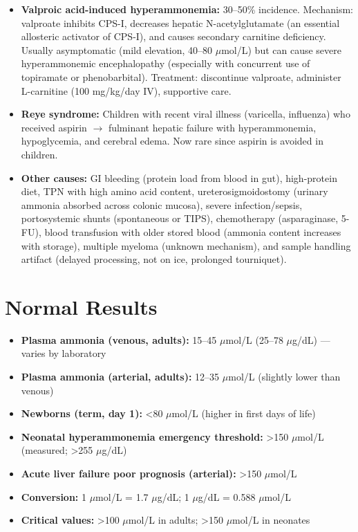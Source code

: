 \begin{itemize}
  \item \textbf{Valproic acid-induced hyperammonemia:} 30--50\% incidence. Mechanism: valproate inhibits CPS-I, decreases hepatic N-acetylglutamate (an essential allosteric activator of CPS-I), and causes secondary carnitine deficiency. Usually asymptomatic (mild elevation, 40--80 $\mu$mol/L) but can cause severe hyperammonemic encephalopathy (especially with concurrent use of topiramate or phenobarbital). Treatment: discontinue valproate, administer L-carnitine (100 mg/kg/day IV), supportive care.
  \item \textbf{Reye syndrome:} Children with recent viral illness (varicella, influenza) who received aspirin $\rightarrow$ fulminant hepatic failure with hyperammonemia, hypoglycemia, and cerebral edema. Now rare since aspirin is avoided in children.
  \item \textbf{Other causes:} GI bleeding (protein load from blood in gut), high-protein diet, TPN with high amino acid content, ureterosigmoidostomy (urinary ammonia absorbed across colonic mucosa), severe infection/sepsis, portosystemic shunts (spontaneous or TIPS), chemotherapy (asparaginase, 5-FU), blood transfusion with older stored blood (ammonia content increases with storage), multiple myeloma (unknown mechanism), and sample handling artifact (delayed processing, not on ice, prolonged tourniquet).
\end{itemize}

\section*{Normal Results}
\begin{itemize}
  \item \textbf{Plasma ammonia (venous, adults):} 15--45 $\mu$mol/L (25--78 $\mu$g/dL) --- varies by laboratory
  \item \textbf{Plasma ammonia (arterial, adults):} 12--35 $\mu$mol/L (slightly lower than venous)
  \item \textbf{Newborns (term, day 1):} <80 $\mu$mol/L (higher in first days of life)
  \item \textbf{Neonatal hyperammonemia emergency threshold:} >150 $\mu$mol/L (measured; >255 $\mu$g/dL)
  \item \textbf{Acute liver failure poor prognosis (arterial):} >150 $\mu$mol/L
  \item \textbf{Conversion:} 1 $\mu$mol/L = 1.7 $\mu$g/dL; 1 $\mu$g/dL = 0.588 $\mu$mol/L
  \item \textbf{Critical values:} >100 $\mu$mol/L in adults; >150 $\mu$mol/L in neonates
\end{itemize}

